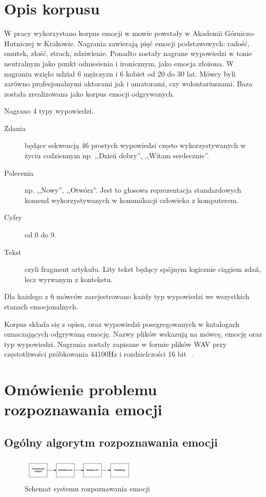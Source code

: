 \documentclass[a4paper,12pt,twoside,openany]{report}
\begin{document}
    \chapter{Opis korpusu}
    W pracy wykorzystano korpus emocji w mowie powstały w Akademii Górniczo-Hutniczej w Krakowie.
    Nagrania zawierają pięć emocji podstawowych: radość, smutek, złość, strach, zdziwienie.
    Ponadto zostały nagrane wypowiedzi w tonie neutralnym jako punkt odniesienia i ironicznym, jako emocja złożona.
    W nagraniu wzięło udział 6 mężczyzn i 6 kobiet od 20 do 30 lat. 
    Mówcy byli zarówno profesjonalnymi aktorami jak i amatorami, czy wolontariuszami.
    Baza została zrealizowana jako korpus emocji odgrywanych. 

    Nagrano 4 typy wypowiedzi.
    \begin{description}
	    \item [Zdania] będące sekwencją 46 prostych wypowiedzi często wykorzystywanych w życiu codziennym 
		    np. ,,Dzień dobry'', ,,Witam serdecznie''. 
	    \item [Polecenia]  np. ,,Nowy'', ,,Otwórz''. 
		    Jest to głosowa reprezentacja standardowych komend wykorzystywanych w komunikacji człowieka z komputerem.
	    \item [Cyfry] od 0 do 9.
	    \item [Tekst] czyli fragment artykułu. 
		    Lity tekst będący spójnym logicznie ciągiem zdań, lecz wyrwanym z kontekstu.
    \end{description}
    Dla każdego z 6 mówców zarejestrowano każdy typ wypowiedzi we wszystkich stanach emocjonalnych.

    Korpus składa się z opisu, oraz wypowiedzi posegregowanych w katalogach oznaczających odgrywaną emocję.
    Nazwy plików wskazują na mówcę, emocję oraz typ wypowiedzi.
    Nagrania zostały zapisane w formie plików WAV przy częstotliwości próbkowania 44100Hz i rozdzielczości 16 bit ~\cite{Igras2009}.

    \chapter{Omówienie problemu rozpoznawania emocji}
    \label{ch:omowienie_problemu}
    \section{Ogólny algorytm rozpoznawania emocji}
    \label{sec:ogol}
    \begin{figure}[h]
        \centering
        \includegraphics[width=0.5\textwidth]{generic_schema}
        \caption{Schemat systemu rozpoznawania emocji}
    \end{figure}
\end{document}
